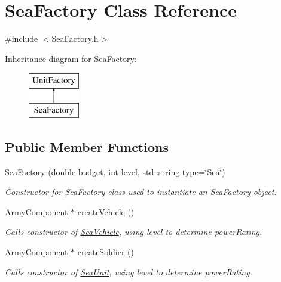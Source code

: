 \hypertarget{class_sea_factory}{}\section{Sea\+Factory Class Reference}
\label{class_sea_factory}


{\ttfamily \#include $<$Sea\+Factory.\+h$>$}

Inheritance diagram for Sea\+Factory\+:\begin{figure}[H]
\begin{center}
\leavevmode
\includegraphics[height=2.000000cm]{class_sea_factory}
\end{center}
\end{figure}
\subsection*{Public Member Functions}
\begin{DoxyCompactItemize}
\item 
\mbox{\hyperlink{class_sea_factory_ac5469712b0ad4cfc597a12c56b37d953}{Sea\+Factory}} (double budget, int \mbox{\hyperlink{class_unit_factory_ac8b73a1ed9adc43991450eb9aed0d40a}{level}}, std\+::string type=\char`\"{}Sea\char`\"{})
\begin{DoxyCompactList}\small\item\em Constructor for \mbox{\hyperlink{class_sea_factory}{Sea\+Factory}} class used to instantiate an \mbox{\hyperlink{class_sea_factory}{Sea\+Factory}} object. \end{DoxyCompactList}\item 
\mbox{\hyperlink{class_army_component}{Army\+Component}} $\ast$ \mbox{\hyperlink{class_sea_factory_a0914bdb14680e6b0c8292ba6f6d13b54}{create\+Vehicle}} ()
\begin{DoxyCompactList}\small\item\em Calls constructor of \mbox{\hyperlink{class_sea_vehicle}{Sea\+Vehicle}}, using level to determine power\+Rating. \end{DoxyCompactList}\item 
\mbox{\hyperlink{class_army_component}{Army\+Component}} $\ast$ \mbox{\hyperlink{class_sea_factory_a29dad98d0d7b89028bd34814219b7b49}{create\+Soldier}} ()
\begin{DoxyCompactList}\small\item\em Calls constructor of \mbox{\hyperlink{class_sea_unit}{Sea\+Unit}}, using level to determine power\+Rating. \end{DoxyCompactList}\end{DoxyCompactItemize}
